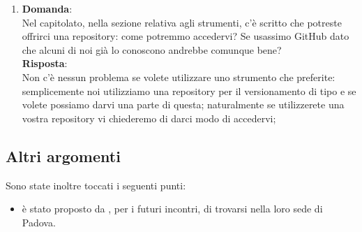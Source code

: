 \documentclass[a4paper,titlepage]{article}
\begin{document}
\begin{enumerate}
  \item \textbf{Domanda}:\\
  Nel capitolato, nella sezione relativa agli strumenti, c'è scritto che potreste offrirci una repository: come potremmo accedervi? Se usassimo GitHub dato che alcuni di noi già lo conoscono andrebbe comunque bene?\\
  \textbf{Risposta}: \\
  Non c'è nessun problema se volete utilizzare uno strumento che preferite: semplicemente noi utilizziamo una repository per il versionamento di tipo  e se volete possiamo darvi una parte di questa; naturalmente se utilizzerete una vostra repository vi chiederemo di darci modo di accedervi;
\end{enumerate}

\subsection{Altri argomenti}
\label{sub:AltriArgomenti}

Sono state inoltre toccati i seguenti punti:

\begin{itemize}
  \item è stato proposto da \PROPONENTE, per i futuri incontri, di trovarsi nella loro sede di Padova.
\end{itemize}
\end{document}
